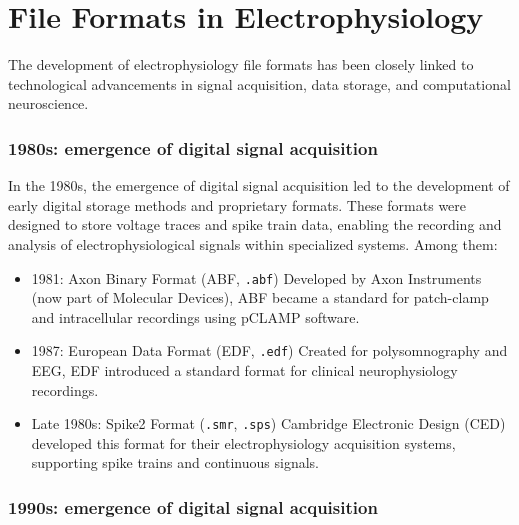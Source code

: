 \documentclass[a4paper,9pt]{extarticle}
\begin{document}
\section{File Formats in Electrophysiology}

\begin{multicols}{2}


The development of electrophysiology file formats has been closely linked to technological advancements in signal acquisition, data storage, and computational neuroscience. 

\medskip


\subsubsection*{1980s: emergence of digital signal acquisition}

In the 1980s, the emergence of digital signal acquisition led to the development of early digital storage methods and proprietary formats. These formats were designed to store voltage traces and spike train data, enabling the recording and analysis of electrophysiological signals within specialized systems. Among them:
\begin{itemize}

\item
{1981: Axon Binary Format (ABF, \texttt{.abf})}  
Developed by Axon Instruments (now part of Molecular Devices), ABF became a standard for patch-clamp and intracellular recordings using pCLAMP software.

\item
{1987: European Data Format (EDF, \texttt{.edf})}  
Created for polysomnography and EEG, EDF introduced a standard format for clinical neurophysiology recordings.

\item

{Late 1980s: Spike2 Format (\texttt{.smr}, \texttt{.sps})}  
Cambridge Electronic Design (CED) developed this format for their electrophysiology acquisition systems, supporting spike trains and continuous signals.
\end{itemize}


\subsubsection*{1990s: emergence of digital signal acquisition}



\end{multicols}
\end{document}
